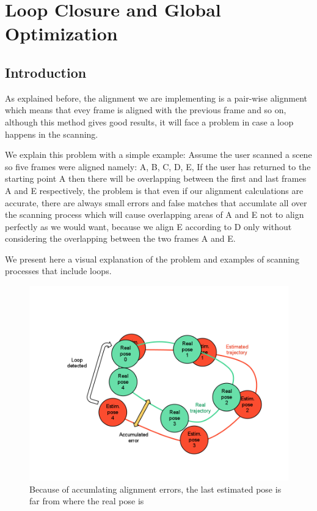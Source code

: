 \chapter{Loop Closure and Global Optimization}
\section{Introduction}
As explained before, the alignment we are implementing is a pair-wise alignment which means that evey frame is aligned with the previous frame and so on, although this method gives good results, it will face a problem in case a loop happens in the scanning.

We explain this problem with a simple example:
Assume the user scanned a scene so five frames were aligned namely: A, B, C, D, E, If the user has returned to the starting point A then there will be overlapping between the first and last frames A and E respectively, the problem is that even if our alignment calculations are accurate, there are always small errors and false matches that accumlate all over the scanning process which will cause overlapping areas of A and E not to align perfectly as we would want, because we align E according to D only without considering the overlapping between the two frames A and E.

\pagebreak
We present here a visual explanation of the problem and examples of scanning processes that include loops.

\begin{figure}[H]
\centering
\includegraphics[scale=0.4,keepaspectratio=true]{Loop/loop_closure.png}
\caption{Because of accumlating alignment errors, the last estimated pose is far from where the real pose is}
\label{fig:loop_closure}
\end{figure}

